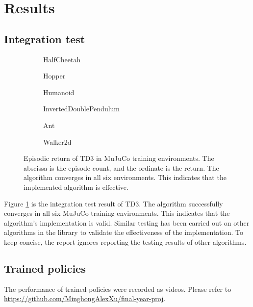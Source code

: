 \newpage
\section{Results} \label{sec:results}

\subsection{Integration test}

\begin{figure}[htbp]
\centering
\begin{subfigure}[b]{0.49\textwidth}
   \centering
   
   \caption{HalfCheetah}
\end{subfigure}
\begin{subfigure}[b]{0.49\textwidth}
   \centering
   
   \caption{Hopper}
\end{subfigure}
\begin{subfigure}[b]{0.49\textwidth}
   \centering
   
   \caption{Humanoid}
\end{subfigure}
\begin{subfigure}[b]{0.49\textwidth}
   \centering
   
   \caption{InvertedDoublePendulum}
\end{subfigure}
\begin{subfigure}[b]{0.49\textwidth}
   \centering
   
   \caption{Ant}
\end{subfigure}
\begin{subfigure}[b]{0.49\textwidth}
   \centering
   
   \caption{Walker2d}
\end{subfigure}
\caption{Episodic return of TD3 in MuJuCo training environments. The abscissa is the episode count, and the ordinate is the return. The algorithm converges in all six environments. This indicates that the implemented algorithm is effective.}
\label{fig:td3_test}
\end{figure}

Figure \ref{fig:td3_test} is the integration test result of TD3. The algorithm successfully converges in all six MuJuCo training environments. This indicates that the algorithm's implementation is valid. Similar testing has been carried out on other algorithms in the library to validate the effectiveness of the implementation. To keep concise, the report ignores reporting the testing results of other algorithms.

\subsection{Trained policies}

The performance of trained policies were recorded as videos. Please refer to \url{https://github.com/MinghongAlexXu/final-year-proj}.
